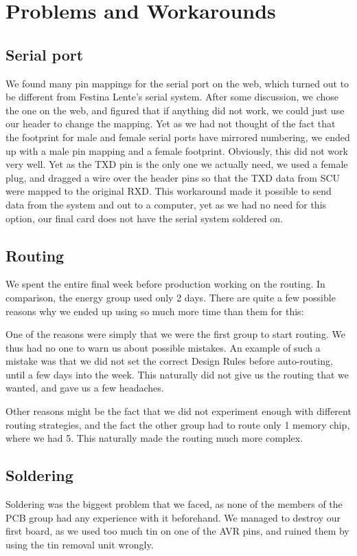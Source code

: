 \section {Problems and Workarounds}
\subsection{Serial port}
\label{sec:serial}
We found many pin mappings for the serial port on the web, which turned out to
be different from Festina Lente's serial system. After some discussion, we chose
the one on the web, and figured that if anything did not work, we could just
use our header to change the mapping.  Yet as we had not thought of the fact
that the footprint for male and female serial ports have mirrored numbering,
we ended up with a male pin mapping and a female footprint.  Obviously,
this did not work very well. Yet as the TXD pin is the only one we actually
need, we used a female plug, and dragged a wire over the header pins so that
the TXD data from SCU were mapped to the original RXD. This workaround made it
possible to send data from the system and out to a computer, yet as we had no
need for this option, our final card does not have the serial system soldered on.

\subsection{Routing}
We spent the entire final week before production working on the routing. In comparison, the energy group used only 2 days. There are quite a few possible reasons why we ended up using so much more time than them for this:

One of the reasons were simply that we were the first group to start routing. We thus had no one to warn us about possible mistakes. An example of such a mistake was that we did not set the correct Design Rules before auto-routing, until a few days into the week. This naturally did not give us the routing that we wanted, and gave us a few headaches.

Other reasons might be the fact that we did not experiment enough with different routing strategies, and the fact the other group had to route only 1 memory chip, where we had 5. This naturally made the routing much more complex.

\subsection{Soldering}
Soldering was the biggest problem that we faced, as none of the members of the
\ac{PCB} group had any experience with it beforehand. We managed to
destroy our first board, as we used too much tin on one of the AVR pins, and
ruined them by using the tin removal unit wrongly.

